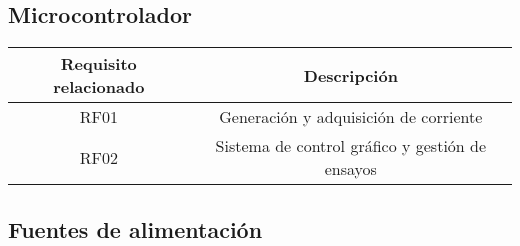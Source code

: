 \documentclass[../et.tex]{subfiles}
\begin{document}


\subsection{Microcontrolador}
\begin{table}[H]
  \centering
  \begin{tabular}{|c|c|}
    \hline
    \rowcolor[HTML]{C0C0C0}
    Requisito relacionado   & Descripción                                     \\ \hline
    RF01                    & Generación y adquisición de corriente           \\ \hline
    RF02                    & Sistema de control gráfico y gestión de ensayos \\ \hline
  \end{tabular}
\end{table}



\subsection{Fuentes de alimentación}

\end{document}
